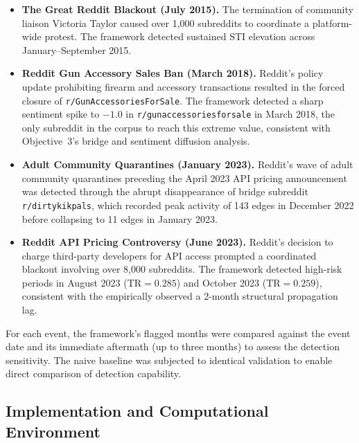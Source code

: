 \documentclass[a4paper,fleqn]{cas-dc}
\begin{document}
\begin{itemize}

  \item \textbf{The Great Reddit Blackout (July 2015).} The
    termination of community liaison Victoria Taylor caused over
    1{,}000 subreddits to coordinate a platform-wide protest.
    The framework detected sustained STI elevation across
    January--September 2015.

  \item \textbf{Reddit Gun Accessory Sales Ban (March 2018).}
    Reddit's policy update prohibiting firearm and accessory
    transactions resulted in the forced closure of
    \texttt{r/GunAccessoriesForSale}. The framework detected a
    sharp sentiment spike to $-1.0$ in \texttt{r/gunaccessoriesforsale}
    in March 2018, the only subreddit in the corpus to reach this
    extreme value, consistent with Objective~3's bridge and
    sentiment diffusion analysis.

  \item \textbf{Adult Community Quarantines (January 2023).}
    Reddit's wave of adult community quarantines preceding the
    April 2023 API pricing announcement was detected through the
    abrupt disappearance of bridge subreddit
    \texttt{r/dirtykikpals}, which recorded peak activity of 143
    edges in December 2022 before collapsing to 11 edges in
    January 2023.

  \item \textbf{Reddit API Pricing Controversy (June 2023).}
    Reddit's decision to charge third-party developers for API
    access prompted a coordinated blackout involving over
    8{,}000 subreddits. The framework detected high-risk periods in
    August 2023 ($\text{TR} = 0.285$) and October 2023
    ($\text{TR} = 0.259$), consistent with the empirically
    observed a 2-month structural propagation lag.

\end{itemize}

For each event, the framework's flagged months were compared against
the event date and its immediate aftermath (up to three months) to
assess the detection sensitivity. The naive baseline was subjected to
identical validation to enable direct comparison of detection
capability.

\subsection{Implementation and Computational Environment}
\label{sec:implementation}
\end{document}
